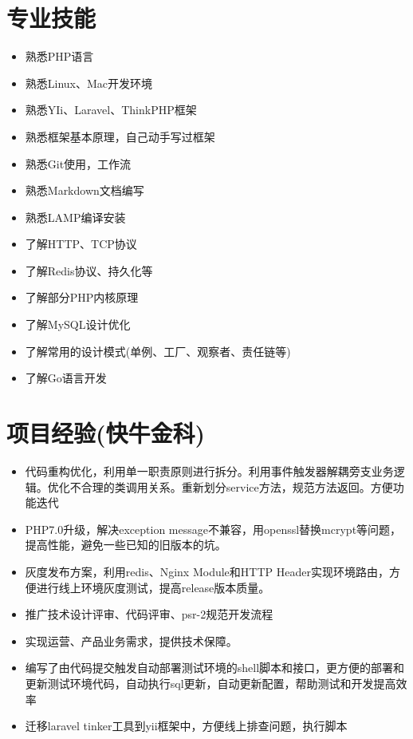 \documentclass[a4paper,12pt]{article}
\begin{document}
\begin{CJK}{UTF8}{gbsn}
		\section{专业技能}
			\begin{itemize}
				\item{熟悉PHP语言}
				\item{熟悉Linux、Mac开发环境}
				\item{熟悉YIi、Laravel、ThinkPHP框架}
				\item{熟悉框架基本原理，自己动手写过框架}
				\item{熟悉Git使用，工作流}
				\item{熟悉Markdown文档编写}
				\item{熟悉LAMP编译安装}
				\item{了解HTTP、TCP协议}
				\item{了解Redis协议、持久化等}
				\item{了解部分PHP内核原理}
				\item{了解MySQL设计优化}
				\item{了解常用的设计模式(单例、工厂、观察者、责任链等)}
				\item{了解Go语言开发}
			\end{itemize}
		
		\section{项目经验(快牛金科)}
			\begin{itemize}
				\item{代码重构优化，利用单一职责原则进行拆分。利用事件触发器解耦旁支业务逻辑。优化不合理的类调用关系。重新划分service方法，规范方法返回。方便功能迭代}
				\item{PHP7.0升级，解决exception message不兼容，用openssl替换mcrypt等问题，提高性能，避免一些已知的旧版本的坑。}
				\item{灰度发布方案，利用redis、Nginx Module和HTTP Header实现环境路由，方便进行线上环境灰度测试，提高release版本质量。}
				\item{推广技术设计评审、代码评审、psr-2规范开发流程}
				\item{实现运营、产品业务需求，提供技术保障。}
				\item{编写了由代码提交触发自动部署测试环境的shell脚本和接口，更方便的部署和更新测试环境代码，自动执行sql更新，自动更新配置，帮助测试和开发提高效率}
				\item{迁移laravel tinker工具到yii框架中，方便线上排查问题，执行脚本}
			\end{itemize}
			

\end{CJK}
\end{document}
